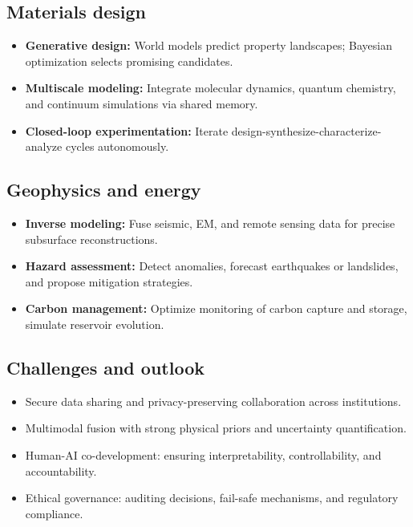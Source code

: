 \documentclass{article}
\begin{document}
\subsection{Materials design}
\begin{itemize}
  \item \textbf{Generative design:} World models predict property landscapes; Bayesian optimization selects promising candidates.
  \item \textbf{Multiscale modeling:} Integrate molecular dynamics, quantum chemistry, and continuum simulations via shared memory.
  \item \textbf{Closed-loop experimentation:} Iterate design-synthesize-characterize-analyze cycles autonomously.
\end{itemize}

\subsection{Geophysics and energy}
\begin{itemize}
  \item \textbf{Inverse modeling:} Fuse seismic, EM, and remote sensing data for precise subsurface reconstructions.
  \item \textbf{Hazard assessment:} Detect anomalies, forecast earthquakes or landslides, and propose mitigation strategies.
  \item \textbf{Carbon management:} Optimize monitoring of carbon capture and storage, simulate reservoir evolution.
\end{itemize}

\subsection{Challenges and outlook}
\begin{itemize}
  \item Secure data sharing and privacy-preserving collaboration across institutions.
  \item Multimodal fusion with strong physical priors and uncertainty quantification.
  \item Human-AI co-development: ensuring interpretability, controllability, and accountability.
  \item Ethical governance: auditing decisions, fail-safe mechanisms, and regulatory compliance.
\end{itemize}
\end{document}
